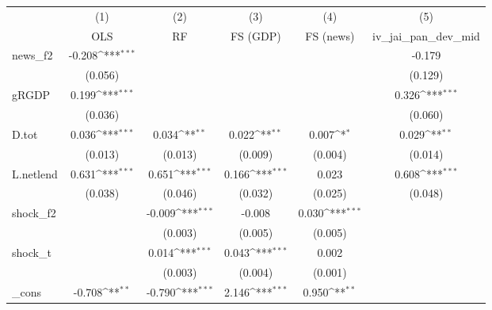 {
\def\sym#1{\ifmmode^{#1}\else\(^{#1}\)\fi}
\begin{tabular}{l*{5}{c}}
\toprule
            &\multicolumn{1}{c}{(1)}&\multicolumn{1}{c}{(2)}&\multicolumn{1}{c}{(3)}&\multicolumn{1}{c}{(4)}&\multicolumn{1}{c}{(5)}\\
            &\multicolumn{1}{c}{OLS}&\multicolumn{1}{c}{RF}&\multicolumn{1}{c}{FS (GDP)}&\multicolumn{1}{c}{FS (news)}&\multicolumn{1}{c}{iv\_jai\_pan\_dev\_mid}\\
\midrule
news\_f2     &      -0.208\sym{***}&                     &                     &                     &      -0.179         \\
            &     (0.056)         &                     &                     &                     &     (0.129)         \\
\addlinespace
gRGDP       &       0.199\sym{***}&                     &                     &                     &       0.326\sym{***}\\
            &     (0.036)         &                     &                     &                     &     (0.060)         \\
\addlinespace
D.tot       &       0.036\sym{***}&       0.034\sym{**} &       0.022\sym{**} &       0.007\sym{*}  &       0.029\sym{**} \\
            &     (0.013)         &     (0.013)         &     (0.009)         &     (0.004)         &     (0.014)         \\
\addlinespace
L.netlend   &       0.631\sym{***}&       0.651\sym{***}&       0.166\sym{***}&       0.023         &       0.608\sym{***}\\
            &     (0.038)         &     (0.046)         &     (0.032)         &     (0.025)         &     (0.048)         \\
\addlinespace
shock\_f2    &                     &      -0.009\sym{***}&      -0.008         &       0.030\sym{***}&                     \\
            &                     &     (0.003)         &     (0.005)         &     (0.005)         &                     \\
\addlinespace
shock\_t     &                     &       0.014\sym{***}&       0.043\sym{***}&       0.002         &                     \\
            &                     &     (0.003)         &     (0.004)         &     (0.001)         &                     \\
\addlinespace
\_cons      &      -0.708\sym{**} &      -0.790\sym{***}&       2.146\sym{***}&       0.950\sym{**} &                     \\

\end{tabular}}
